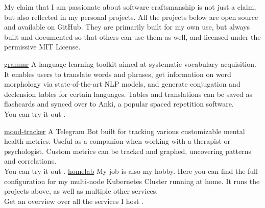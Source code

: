 \documentclass[9pt]{developercv} %
\begin{document}

    My claim that I am passionate about software craftsmanship is not just a claim, but also reflected in my personal projects.
    All the projects below are open source and available on GitHub.
    They are primarily built for my own use, but always built and documented so that others can use them as well,
    and licensed under the permissive MIT License. \\

    \begin{entrylist}
        \project
        {\href{https://github.com/twaslowski/grammr}{ grammr}}
        {
            A language learning toolkit aimed at systematic vocabulary acquisition.
            It enables users to translate words and phrases, get information on word morphology via state-of-the-art
        NLP models, and generate conjugation and declension tables for certain languages.
        Tables and translations can be saved as flashcards and synced over to Anki, a popular spaced repetition software.\\
        You can try it out .
        }

        \project
        {\href{https://github.com/twaslowski/open-mood-tracker}{ mood-tracker}}
        {
        A Telegram Bot built for tracking various customizable mental health metrics. Useful as a companion when
        working with a therapist or psychologist. Custom metrics can be tracked and graphed, uncovering patterns
        and correlations.\\
        You can try it out .
        }
        \project
        {\href{https://github.com/twaslowski/homelab}{ homelab}}
        {
        My job is also my hobby. Here you can find the full configuration for my multi-node Kubernetes Cluster running
        at home. It runs the projects above, as well as multiple other services.\\
        Get an overview over all the services I host .
        }
    \end{entrylist}

\end{document}
